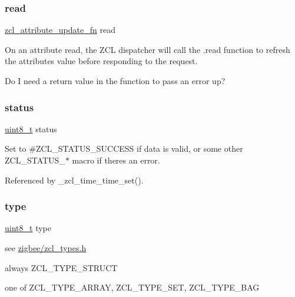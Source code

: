 \subsubsection{\texorpdfstring{read}{read}}
{\footnotesize\ttfamily \hyperlink{group__zcl_gace94cfc3f22379fa08a5b8de8c6977f6}{zcl\+\_\+attribute\+\_\+update\+\_\+fn} read}



On an attribute read, the Z\+CL dispatcher will call the .read function to refresh the attribute\textquotesingle{}s value before responding to the request. 

Do I need a return value in the function to pass an error up? \mbox{\label{group__zcl_gade818037fd6c985038ff29656089758d}} 
\subsubsection{\texorpdfstring{status}{status}}
{\footnotesize\ttfamily \hyperlink{group__hal__dos_gae1affc9ca37cfb624959c866a73f83c2}{uint8\+\_\+t} status}



Set to \#\+Z\+C\+L\+\_\+\+S\+T\+A\+T\+U\+S\+\_\+\+S\+U\+C\+C\+E\+SS if data is valid, or some other Z\+C\+L\+\_\+\+S\+T\+A\+T\+U\+S\+\_\+$\ast$ macro if there\textquotesingle{}s an error. 



Referenced by \+\_\+zcl\+\_\+time\+\_\+time\+\_\+set().

\mbox{\label{group__zcl_ga1d127017fb298b889f4ba24752d08b8e}} 
\subsubsection{\texorpdfstring{type}{type}}
{\footnotesize\ttfamily \hyperlink{group__hal__dos_gae1affc9ca37cfb624959c866a73f83c2}{uint8\+\_\+t} type}



see \hyperlink{zcl__types_8h}{zigbee/zcl\+\_\+types.\+h} 

always Z\+C\+L\+\_\+\+T\+Y\+P\+E\+\_\+\+S\+T\+R\+U\+CT

one of Z\+C\+L\+\_\+\+T\+Y\+P\+E\+\_\+\+A\+R\+R\+AY, Z\+C\+L\+\_\+\+T\+Y\+P\+E\+\_\+\+S\+ET, Z\+C\+L\+\_\+\+T\+Y\+P\+E\+\_\+\+B\+AG

